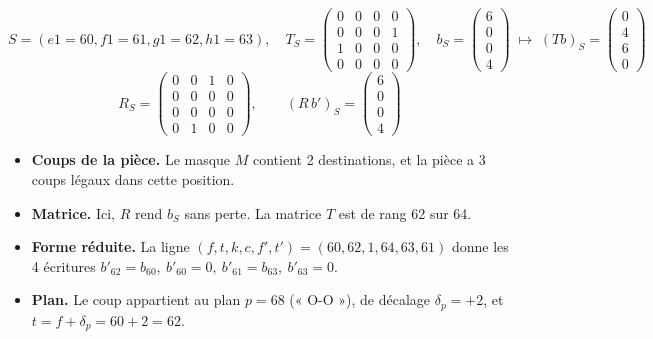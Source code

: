 \[ S = (e1=60, f1=61, g1=62, h1=63),\quad T_S = \begin{pmatrix}0 & 0 & 0 & 0 \\ 0 & 0 & 0 & 1 \\ 1 & 0 & 0 & 0 \\ 0 & 0 & 0 & 0\end{pmatrix},\quad b_S = \begin{pmatrix}6 \\ 0 \\ 0 \\ 4\end{pmatrix}\;\longmapsto\; (Tb)_S =\begin{pmatrix}0 \\ 4 \\ 6 \\ 0\end{pmatrix} \]
\[ R_S = \begin{pmatrix}0 & 0 & 1 & 0 \\ 0 & 0 & 0 & 0 \\ 0 & 0 & 0 & 0 \\ 0 & 1 & 0 & 0\end{pmatrix},\qquad (R\,b')_S = \begin{pmatrix}6 \\ 0 \\ 0 \\ 4\end{pmatrix} \]
\begin{itemize}
\item \textbf{Coups de la pièce.} Le masque $M$ contient 2 destinations, et la pièce a 3 coups légaux dans cette position.
\item \textbf{Matrice.} Ici, $R$ rend $b_S$ sans perte. La matrice $T$ est de rang 62 sur 64.
\item \textbf{Forme réduite.} La ligne $(f, t, k, c, f', t') = (60, 62, 1, 64, 63, 61)$ donne les 4 écritures $b'_{62} = b_{60},\ b'_{60} = 0,\ b'_{61} = b_{63},\ b'_{63} = 0$.
\item \textbf{Plan.} Le coup appartient au plan $p = 68$ (« O-O »), de décalage $\delta_p = +2$, et $t = f + \delta_p = 60 +2 = 62$.
\end{itemize}
